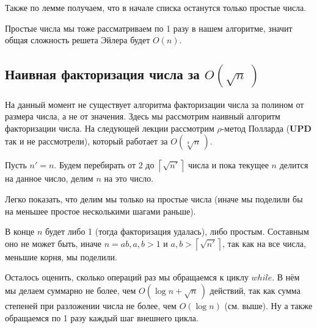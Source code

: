 \documentclass[a4paper, 12pt]{article}
\begin{document}
Также по лемме получаем, что в начале списка останутся только простые числа.

Простые числа мы тоже рассматриваем по 1 разу в нашем алгоритме, значит
общая сложность решета Эйлера будет $O(n)$.

\subsection{Наивная факторизация числа за $O(\sqrt{n}\,)$}

На данный момент не существует алгоритма факторизации числа за
полином от размера числа, а не от значения. Здесь мы рассмотрим наивный алгоритм
факторизации числа. На следующей лекции рассмотрим $\rho$-метод Полларда 
({\bf UPD} так и не рассмотрели), который работает за $O(\sqrt[4]{n}\,)$.

Пусть $n' = n$.
Будем перебирать от $2$ до $\left\lceil \sqrt{n'} \right\rceil$ числа и пока
текущее $n$ делится на данное число, делим $n$ на это число.

Легко показать, что делим мы только на простые числа (иначе мы поделили бы на
меньшее простое несколькими шагами раньше).

В конце $n$ будет либо 1 (тогда факторизация удалась), либо простым. Составным
оно не может быть, иначе $n = ab, a, b > 1$ и $a, b > \left\lceil \sqrt{n'}\right\rceil$, 
так как на все числа, меньшие корня, мы поделили.

Осталось оценить, сколько операций раз мы обращаемся к циклу $while$. В нём мы делаем
суммарно не более, чем $O(\log n + \sqrt{n}\,)$ действий, так как сумма
степеней при разложении числа не более, чем $O(\log n)$ (см. выше). Ну а также
обращаемся по 1 разу каждый шаг внешнего цикла.
\end{document}
